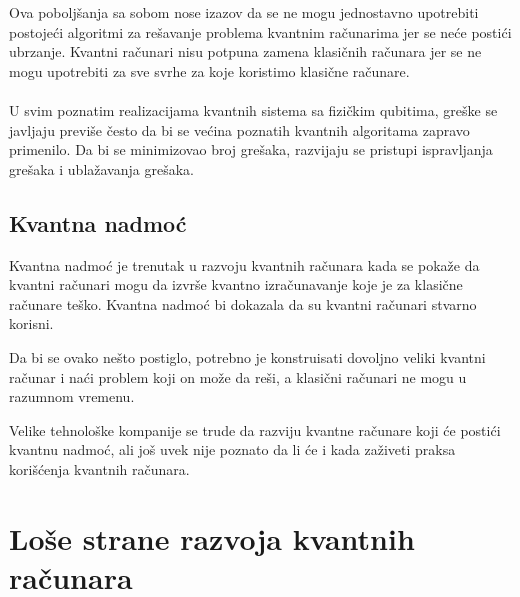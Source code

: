 \documentclass[fleqn, 12pt]{article}
\begin{document}
\begin{text}
Ova poboljšanja sa sobom nose izazov da se ne mogu jednostavno upotrebiti postojeći algoritmi za rešavanje problema kvantnim računarima jer se neće postići ubrzanje. Kvantni računari nisu potpuna zamena klasičnih računara jer se ne mogu upotrebiti za sve svrhe za koje koristimo klasične računare.
\\\\

U svim poznatim realizacijama kvantnih sistema sa fizičkim qubitima, greške se javljaju previše često da bi se većina poznatih kvantnih algoritama zapravo primenilo. \cite{G2} Da bi se minimizovao broj grešaka, razvijaju se pristupi ispravljanja grešaka i ublažavanja grešaka. \cite{G1}
\end{text}

\newpage

\subsection{Kvantna nadmoć}

\begin{text}
Kvantna nadmoć je trenutak u razvoju kvantnih računara kada se pokaže da kvantni računari mogu da izvrše kvantno izračunavanje koje je za klasične računare teško. Kvantna nadmoć bi dokazala da su kvantni računari stvarno korisni. \cite{G1}

Da bi se ovako nešto postiglo, potrebno je konstruisati dovoljno veliki kvantni računar i naći problem koji on može da reši, a klasični računari ne mogu u razumnom vremenu. \cite{G1}

Velike tehnološke kompanije se trude da razviju kvantne računare koji će postići kvantnu nadmoć, ali još uvek nije poznato da li će i kada zaživeti praksa korišćenja kvantnih računara.
\end{text}

\newpage

\section{Loše strane razvoja kvantnih računara}
\end{document}
